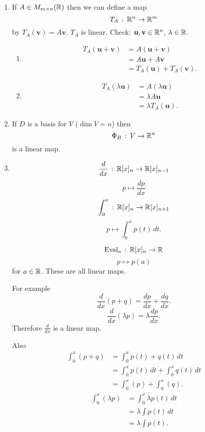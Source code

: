 \documentclass[10pt, a4paper]{article}
\newcommand{\mbf}[1]{\mathbf{#1}}
\begin{document}
\begin{example}
    \begin{enumerate}[label = (\roman*)]
        \item If $A \in M_{m \times n}(\mathbb{R})$ then we can define a map
        \[
        T_A\,:\,\mathbb{R} ^ n \rightarrow \mathbb{R} ^ m
        \]
        by $T_A(\mbf{v}) = A\mbf{v}$.
        $T_A$ is linear.
        Check:
        $\mbf{u, v} \in \R ^ n$,
        $\lambda \in \mathbb{R}$.
        \begin{enumerate}[label = (\roman*)]
            \item 
            \begin{align*}
                T_A(\mbf{u + v}) &= A(\mbf{u + v}) \\
                &= A\mbf{u} + A\mbf{v} \\
                &= T_A(\mbf{u}) + T_A(\mbf{v}).
            \end{align*}
            \item
            \begin{align*}
                T_A(\lambda\mbf{u}) &= A(\lambda\mbf{u}) \\
                &= \lambda A\mbf{u} \\
                &= \lambda T_A(\mbf{u}).
            \end{align*}
        \end{enumerate}
        \item If $D$ is a basis for $V$
        ($\dim{V} = n$)
        then
        \[
        \Phi_{B}\,:\, V \rightarrow \mathbb{R} ^ n
        \]
        is a linear map.
        \item
        \[
        \frac{d}{dx}\,:\,\mathbb{R}[x]_n \rightarrow \mathbb{R}[x]_{n - 1}
        \]
        \[
        p \mapsto \frac{dp}{dx}
        \]
        \[
        \int_{0}^{x}\,:\,\mathbb{R}[x]_n \rightarrow \mathbb{R}[x]_{n + 1}
        \]
        \[
        p \mapsto \int_{0}^{x}p(t)\,dt.
        \]

        \[
        \mathrm{Eval}_a\,:\,\mathbb{R}[x]_n \rightarrow \mathbb{R}
        \]
        \[
        p \mapsto p(a)
        \]
        for $a \in \mathbb{R}$.
        These are all linear maps.

        For example
        \[
        \frac{d}{dx}(p + q) = \frac{dp}{dx} + \frac{dq}{dx}.
        \]
        \[
        \frac{d}{dx}(\lambda p) = \lambda\frac{dp}{dx}.
        \]
        Therefore $\frac{d}{dx}$ is a linear map.

        Also
        \begin{align*}
            \int_{0}^{x}(p + q) &= \int_{0}^{x}p(t) + q(t)\,dt \\
            &= \int_{0}^{x}p(t)\,dt + \int_{0}^{x}q(t)\,dt \\
            &= \int_{0}^{x}(p) + \int_{0}^{x}(q).
        \end{align*}
        \begin{align*}
            \int_{0}^{x}(\lambda p) &= \int_{0}^{x}\lambda p(t)\,dt \\
            &= \lambda\int p(t)\,dt \\
            &= \lambda\int p(t). \\
        \end{align*}


\end{enumerate}
\end{example}
\end{document}
